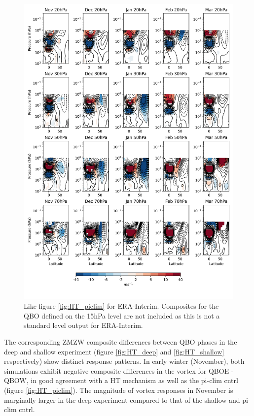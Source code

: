 \begin{figure}[h!]
\begin{center}
\noindent\includegraphics[width = 0.8\linewidth]{Figures/Figures-deepQBO/LAGGED_ZMZW_composites_by_month_QBO_phases_U_ERA_MarQBO_vs_Mar_70hPa_5thresh.png}
\caption[ZMZW composites under different QBO phases in ERA-Interim]{Like figure \ref{fig:HT_piclim} for ERA-Interim. Composites for the QBO defined on the 15hPa level are not included as this is not a standard level output for ERA-Interim. }
\label{fig:HT_ERA}
\end{center}
\end{figure}

The corresponding ZMZW composite differences between QBO phases in the deep and shallow experiment (figure \ref{fig:HT_deep} and \ref{fig:HT_shallow} respectively) show distinct response patterns. In early winter (November), both simulations exhibit negative composite differences in the vortex for QBOE - QBOW, in good agreement with a HT mechanism \citep{HoltonJamesRTan1980} as well as the pi-clim cntrl (figure \ref{fig:HT_piclim}). The magnitude of vortex responses in November is marginally larger in the deep experiment compared to that of the shallow and pi-clim cntrl. 

